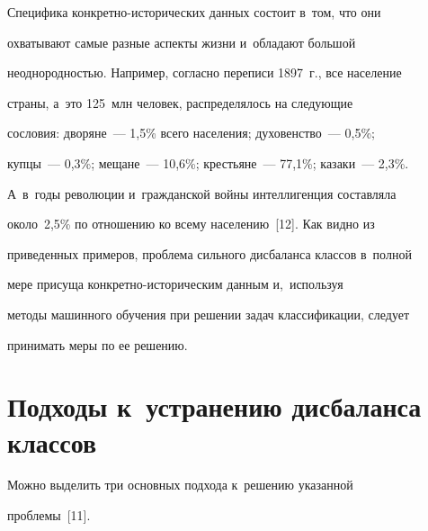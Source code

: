   


  Специфика конкретно-исторических данных состоит в~том, что они 


охватывают самые разные аспекты жизни и~обладают большой 


неоднородностью. Например, согласно переписи 1897~г., все население 


страны, а~это 125~млн человек, распределялось на следующие 


сословия: дворяне~--- 1,5\% всего населения; духовенство~--- 0,5\%;  


куп\-цы~--- 0,3\%; мещане~--- 10,6\%; крестьяне~--- 77,1\%; казаки~--- 2,3\%. 


А~в~годы революции и~гражданской войны интеллигенция составляла 


около~2,5\% по отношению ко всему населению~[12]. Как видно из 


приведенных примеров, проб\-ле\-ма сильного дисбаланса классов в~полной 


мере присуща кон\-крет\-но-ис\-то\-ри\-че\-ским данным и,~используя 


методы машинного обучения при решении задач классификации, следует 


принимать меры по ее решению.


  


\section{Подходы к~устранению дисбаланса классов}





  Можно выделить три основных подхода к~решению указанной  


проб\-ле\-мы~[11]. 


